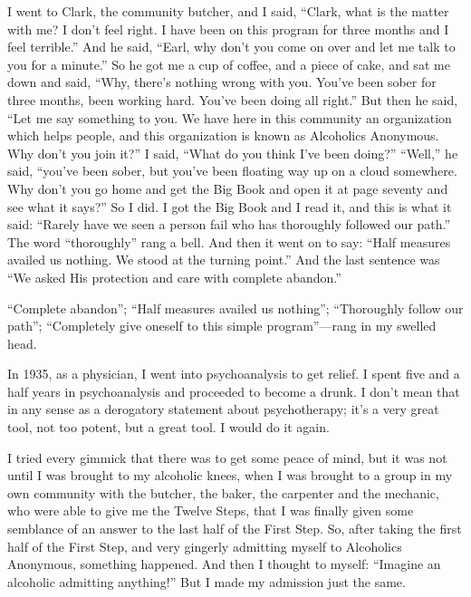 \begin{biblechapter}
\verse I went to Clark, the community butcher, and I said, 
    “Clark, what is the matter with me? 
\verse I don’t feel right.
\verse I have been on this program for three months and I feel terrible.”
\verse And he said, “Earl, 
    why don’t you come on over and let me talk to you for a minute.”
\verse So he got me a cup of coffee, and a piece of cake, 
    and sat me down and said, 
    “Why, there’s nothing wrong with you.
\verse You’ve been sober for three months, been working hard.
\verse You’ve been doing all right.”
\verse But then he said, 
    “Let me say something to you.
\verse We have here in this community an organization which helps people,
    and this organization is known as Alcoholics Anonymous.
\verse Why don’t you join it?”
\verse I said, “What do you think I’ve been doing?”
\verse “Well,” he said, 
    “you’ve been sober, 
    but you’ve been floating way up on a cloud somewhere.
\verse Why don’t you go home and get the Big Book 
    and open it at page seventy and see what it says?”
\verse So I did.
\verse I got the Big Book and I read it, 
    and this is what it said: 
    “Rarely have we seen a person fail 
    who has thoroughly followed our path.”
\verse The word “thoroughly” rang a bell.
\verse And then it went on to say: 
    “Half measures availed us nothing.
\verse We stood at the turning point.”
\verse And the last sentence was 
    “We asked His protection and care with complete abandon.”

\verse “Complete abandon”; 
    “Half measures availed us nothing”; 
    “Thoroughly follow our path”; 
    “Completely give oneself to this simple program”—rang 
    in my swelled head.

\verse In 1935, as a physician, 
    I went into psychoanalysis to get relief.
\verse I spent five and a half years in psychoanalysis 
    and proceeded to become a drunk.
\verse I don’t mean that in any sense as a 
    derogatory statement about psychotherapy; 
    it’s a very great tool, not too potent, but a great tool.
\verse I would do it again.

\verse I tried every gimmick that there was to get some peace of mind, 
    but it was not until I was brought to my alcoholic knees, 
    when I was brought to a group in my own community 
    with the butcher, the baker, the carpenter and the mechanic, 
    who were able to give me the Twelve Steps, 
    that I was finally given some semblance of an answer 
    to the last half of the First Step.
\verse So, after taking the first half of the First Step, 
    and very gingerly admitting myself to Alcoholics Anonymous, 
    something happened.
\verse And then I thought to myself: 
    “Imagine an alcoholic admitting anything!”
\verse But I made my admission just the same.


\end{biblechapter}
